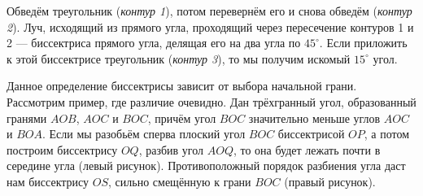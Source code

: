 \begin{itemize}
\itA %
%
Обведём треугольник ({\itshape контур 1}), потом перевернём его и снова обведём ({\itshape контур 2}).
Луч, исходящий из прямого угла, проходящий через пересечение контуров 1 и 2 --- биссектриса прямого угла,
делящая его на два угла по $45^\circ$.
Если приложить к этой биссектрисе треугольник ({\itshape контур 3}), то мы получим искомый $15^\circ$ угол.

\begin{center}\end{center}

\itB %
%
Данное определение биссектрисы зависит от выбора начальной грани. Рассмотрим пример,
где различие очевидно. Дан трёхгранный угол, образованный гранями $AOB$, $AOC$ и $BOC$,
причём угол $BOC$ значительно меньше углов $AOC$ и $BOA$.
Если мы разобьём сперва плоский угол $BOC$ биссектрисой $OP$, а потом 
построим биссектрису $OQ$, разбив угол $AOQ$, то она будет лежать почти в середине угла (левый рисунок).
Противоположный порядок разбиения угла даст нам биссектрису $OS$, сильно смещённую к грани $BOC$ (правый рисунок).



\end{itemize}
